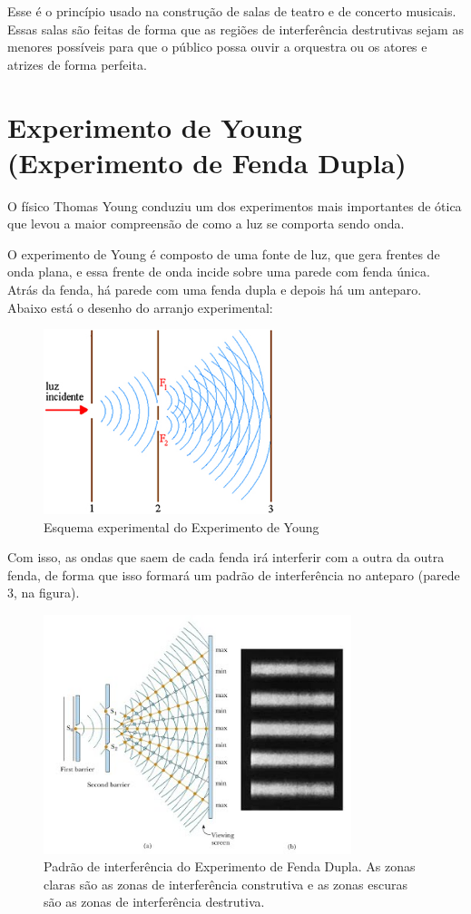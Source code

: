 \documentclass[12pt]{extarticle}
\newcommand{\<}{\langle}
\renewcommand{\>}{\rangle}
\theoremstyle{definition}
\begin{document}
Esse é o princípio usado na construção de salas de teatro e de concerto musicais. Essas salas são feitas de forma que as regiões de interferência destrutivas sejam as menores possíveis para que o público possa ouvir a orquestra ou os atores e atrizes de forma perfeita.

\section{Experimento de Young (Experimento de Fenda Dupla)}
O físico Thomas Young conduziu um dos experimentos mais importantes de ótica que levou a maior compreensão de como a luz se comporta sendo onda. 

O experimento de Young é composto de uma fonte de luz, que gera frentes de onda plana, e essa frente de onda incide sobre uma parede com fenda única. Atrás da fenda, há parede com uma fenda dupla e depois há um anteparo. Abaixo está o desenho do arranjo experimental:

\begin{figure}[H]
    \centering
    \includegraphics[width=0.6\textwidth]{fenda_dupla.jpg}
    \caption{Esquema experimental do Experimento de Young}
    \label{fig:Young}
\end{figure}
Com isso, as ondas que saem de cada fenda irá interferir com a outra da outra fenda, de forma que isso formará um padrão de interferência no anteparo (parede 3, na figura).
\begin{figure}[H]
    \centering
    \includegraphics[width=0.8\textwidth]{young_2.jpg}
    \caption{Padrão de interferência do Experimento de Fenda Dupla. As zonas claras são as zonas de interferência construtiva e as zonas escuras são as zonas de interferência destrutiva.}
    \label{fig:young_interferencia}
\end{figure}
\end{document}
